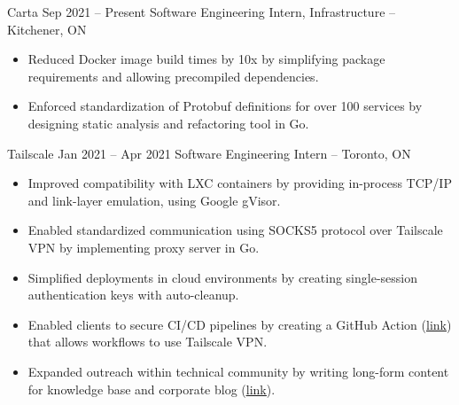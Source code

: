 \documentclass{article}
\begin{document}
\normalsize
\WorkEntry
{Carta}
{Sep 2021 -- Present}
{Software Engineering Intern, Infrastructure -- Kitchener, ON}
{
\begin{itemize} \itemsep -1pt
    \item Reduced Docker image build times by 10x by simplifying package requirements and allowing precompiled dependencies.
    \item Enforced standardization of Protobuf definitions for over 100 services by designing static analysis and refactoring tool in Go.
\end{itemize}
}
\iffalse
Made Tailscale ready for the cloud, by creating features that allowed it to run in lightweight, unprivileged container environments. This included a virtual networking stack for connecting to the Tailscale network without kernel privileges to create a network driver, a SOCKS5 proxy to allow applications to communicate over this virtual networking stack, and ephemeral authentication keys for stateless access to the Tailscale network. Also published long-form technical content on company blog (https://tailscale.com/blog/2021-05-github-actions-and-tailscale/) and contributed to product knowledge base.
\fi
\WorkEntry
{Tailscale}
{Jan 2021 -- Apr 2021}
{Software Engineering Intern -- Toronto, ON}
{\begin{itemize} \itemsep -1pt
    \item Improved compatibility with LXC containers by providing in-process TCP/IP and link-layer emulation, using Google gVisor.
    \item Enabled standardized communication using SOCKS5 protocol over Tailscale VPN by implementing proxy server in Go.
    \item Simplified deployments in cloud environments by creating single-session authentication keys with auto-cleanup.
    \item Enabled clients to secure CI/CD pipelines by creating a GitHub Action (\underline{\href{https://github.com/tailscale/github-action}{link}}) that allows workflows to use Tailscale VPN. %
    \item Expanded outreach within technical community by writing long-form content for knowledge base and corporate blog (\underline{\href{https://tailscale.com/blog/2021-05-github-actions-and-tailscale/}{link}}).
    \end{itemize}}
\vspace{1mm}
\end{document}

